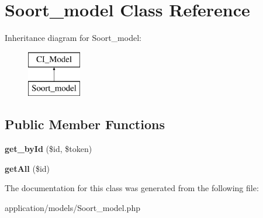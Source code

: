 \hypertarget{class_soort__model}{}\section{Soort\+\_\+model Class Reference}
\label{class_soort__model}
Inheritance diagram for Soort\+\_\+model\+:\begin{figure}[H]
\begin{center}
\leavevmode
\includegraphics[height=2.000000cm]{class_soort__model}
\end{center}
\end{figure}
\subsection*{Public Member Functions}
\begin{DoxyCompactItemize}
\item 
\mbox{\label{class_soort__model_a56ce0c577bb5f34bcc355107c47f06e8}} 
{\bfseries get\+\_\+by\+Id} (\$id, \$token)
\item 
\mbox{\label{class_soort__model_a9169319ec748964dc67f0f640d182250}} 
{\bfseries get\+All} (\$id)
\end{DoxyCompactItemize}


The documentation for this class was generated from the following file\+:\begin{DoxyCompactItemize}
\item 
application/models/Soort\+\_\+model.\+php\end{DoxyCompactItemize}
